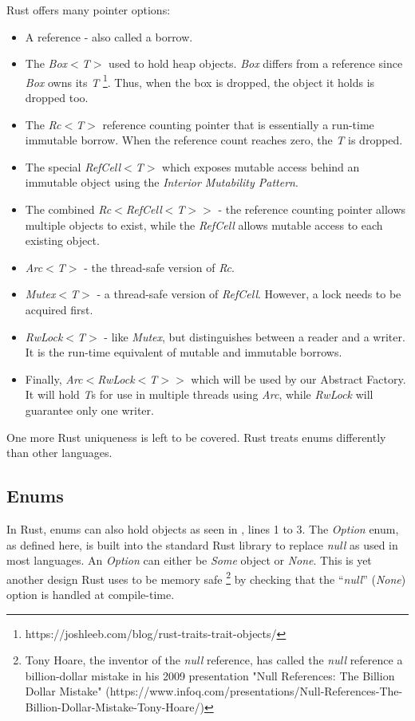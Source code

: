 Rust offers many pointer options: \cite{klabnik_2019_01}
\begin{itemize}
	\item A reference - also called a borrow.
	\item The \textit{Box$<$T$>$} used to hold heap objects.
	      \textit{Box} differs from a reference since \textit{Box} owns its \textit{T} \footnote{https://joshleeb.com/blog/rust-traits-trait-objects/}.
	      Thus, when the box is dropped, the object it holds is dropped too.
	\item The \textit{Rc$<$T$>$} reference counting pointer that is essentially a run-time immutable borrow.
	      When the reference count reaches zero, the \textit{T} is dropped.
	\item The special \textit{RefCell$<$T$>$} which exposes mutable access behind an immutable object using the \textit{Interior Mutability Pattern}.
	\item The combined \textit{Rc$<$RefCell$<$T$>$$>$} - the reference counting pointer allows multiple objects to exist, while the \textit{RefCell} allows mutable access to each existing object.
	\item \textit{Arc$<$T$>$} - the thread-safe version of \textit{Rc}.
	\item \textit{Mutex$<$T$>$} - a thread-safe version of \textit{RefCell}.
	      However, a lock needs to be acquired first.
	\item \textit{RwLock$<$T$>$} - like \textit{Mutex}, but distinguishes between a reader and a writer.
	      It is the run-time equivalent of mutable and immutable borrows.
	\item Finally, \textit{Arc$<$RwLock$<$T$>$$>$} which will be used by our Abstract Factory.
	      It will hold \textit{T}s for use in multiple threads using \textit{Arc}, while \textit{RwLock} will guarantee only one writer.
\end{itemize}

One more Rust uniqueness is left to be covered. Rust treats enums differently than other languages.

\subsection{Enums}
In Rust, enums can also hold objects \cite{klabnik_2019_01} as seen in , lines 1 to 3.
The \textit{Option} enum, as defined here, is built into the standard Rust library \cite{klabnik_2019_01} to replace \textit{null} as used in most languages.
An \textit{Option} can either be \textit{Some} object or \textit{None}.
This is yet another design Rust uses to be memory safe \footnote{Tony Hoare, the inventor of the \textit{null} reference, has called the \textit{null} reference a billion-dollar mistake in his 2009 presentation "Null References: The Billion Dollar Mistake" (https://www.infoq.com/presentations/Null-References-The-Billion-Dollar-Mistake-Tony-Hoare/)} by checking that the ``\textit{null}'' (\textit{None}) option is handled at compile-time.


